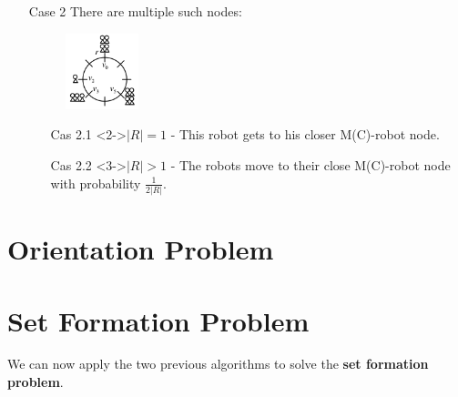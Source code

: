 \documentclass{beamer}
\begin{document}
\begin{frame}
	\begin{itemize}
		\item[Case 2] There are multiple such nodes:
			\begin{figure}[h]
   				\includegraphics[width=0.2\textwidth]{images/random_configuration.png}
			\end{figure}
			\begin{itemize}
				\item[Cas 2.1]<2->$|R| = 1$ - This robot gets to his closer M(C)-robot node. 
				\item[Cas 2.2]<3->$|R| > 1$ - The robots move to their close M(C)-robot node with probability $\frac{1}{2|R|}$.
			\end{itemize}
	\end{itemize}
\end{frame}





\section{Orientation Problem}
\begin{frame}
\end{frame}





\section{Set Formation Problem}
\begin{frame}
	We can now apply the two previous algorithms to solve the \textbf{set formation problem}.
\end{frame}
\end{document}
